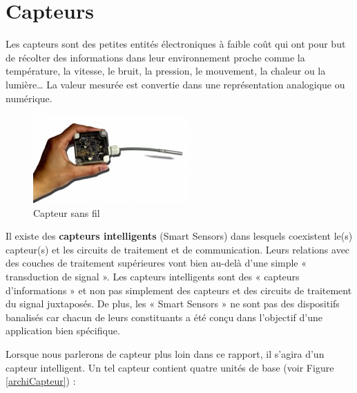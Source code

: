 \section{Capteurs}

Les capteurs sont des petites entités électroniques à faible coût qui ont pour but de récolter des informations dans leur environnement proche comme la température, la vitesse, le bruit, la pression, le mouvement, la chaleur ou la lumière… La valeur mesurée est convertie dans une représentation analogique ou numérique.

\begin{figure}[h]
\centering
\includegraphics[scale=0.5]{Intro/imageCapteur}
\caption{\label{imageCapteur} Capteur sans fil}
\end{figure}

Il existe des \textbf{capteurs intelligents} (Smart Sensors) dans lesquels coexistent le(s) capteur(s) et les circuits de traitement et de communication. Leurs relations avec des couches de traitement supérieures vont bien au-delà d’une simple « transduction de signal ». Les capteurs intelligents sont des « capteurs d’informations » et non pas simplement des capteurs et des circuits de traitement du signal juxtaposés. De plus, les « Smart Sensors » ne sont pas des dispositifs banalisés car chacun de leurs constituants a été conçu dans l’objectif d’une application bien spécifique.

Lorsque nous parlerons de capteur plus loin dans ce rapport, il s'agira d'un capteur intelligent. Un tel capteur contient quatre unités de base (voir Figure \ref{archiCapteur}) : 
 
